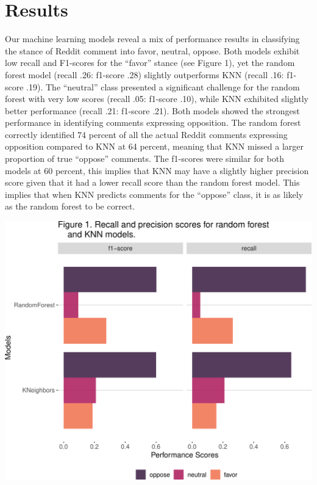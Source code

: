\documentclass[
  12pt]{article}
\begin{document}
\section{Results}\label{results}

Our machine learning models reveal a mix of performance results in
classifying the stance of Reddit comment into favor, neutral, oppose.
Both models exhibit low recall and F1-scores for the ``favor'' stance
(see Figure 1), yet the random forest model (recall .26: f1-score .28)
slightly outperforms KNN (recall .16: f1-score .19). The ``neutral''
class presented a significant challenge for the random forest with very
low scores (recall .05: f1-score .10), while KNN exhibited slightly
better performance (recall .21: f1-score .21). Both models showed the
strongest performance in identifying comments expressing opposition. The
random forest correctly identified 74 percent of all the actual Reddit
comments expressing opposition compared to KNN at 64 percent, meaning
that KNN missed a larger proportion of true ``oppose'' comments. The
f1-scores were similar for both models at 60 percent, this implies that
KNN may have a slightly higher precision score given that it had a lower
recall score than the random forest model. This implies that when KNN
predicts comments for the ``oppose'' class, it is as likely as the
random forest to be correct.

\includegraphics{assign_3_files/figure-pdf/unnamed-chunk-3-1.pdf}
\end{document}

